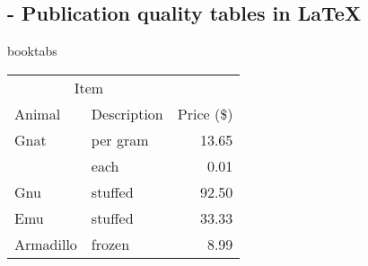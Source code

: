 
\subsection{ - Publication quality tables in LaTeX}

\begin{demo}{}{booktabs}
	\begin{tabular}{@{}llr@{}} \toprule
		\multicolumn{2}{c}{Item}             \\ \cmidrule(r){1-2}
		Animal    & Description & Price (\$) \\ \midrule
		Gnat      & per gram    & 13.65      \\
		          & each        & 0.01       \\
		Gnu       & stuffed     & 92.50      \\
		Emu       & stuffed     & 33.33      \\
		Armadillo & frozen      & 8.99       \\ \bottomrule
	\end{tabular}
\end{demo}
